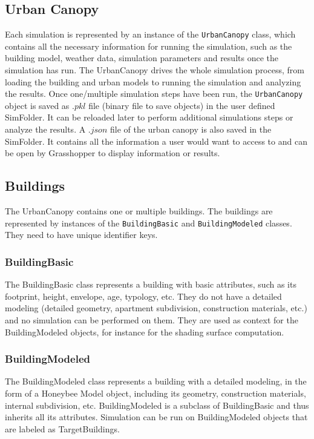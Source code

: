 \documentclass[a4paper,12pt]{article} %
\begin{document}
    \subsection{Urban Canopy}
    \label{subsec:urban-canopy}
    Each simulation is represented by an instance of the \texttt{UrbanCanopy} class, which contains all the necessary information for running the simulation, such as the building model, weather data, simulation parameters and results once the simulation has run.
    The \gls{UrbanCanopy} drives the whole simulation process, from loading the building and urban models to running the simulation and analyzing the results.
    Once one/multiple simulation steps have been run, the \texttt{UrbanCanopy} object is saved as $.pkl$ file (binary file to save objects) in the user defined \gls{SimFolder}.
    It can be reloaded later to perform additional simulations steps or analyze the results.
    A $.json$ file of the urban canopy is also saved in the \gls{SimFolder}.
    It contains all the information a user would want to access to and can be open by Grasshopper to display information or results.

    \subsection{Buildings}
    \label{subsec:buildings}
    The \gls{UrbanCanopy} contains one or multiple buildings.
    The buildings are represented by instances of the \texttt{BuildingBasic} and \texttt{BuildingModeled} classes.
    They need to have unique identifier keys.

    \subsubsection{BuildingBasic}
    \label{subsubsec:building-basic}
    The \gls{BuildingBasic} class represents a building with basic attributes, such as its footprint, height, envelope, age, typology, etc.
    They do not have a detailed modeling (detailed geometry, apartment subdivision, construction materials, etc.) and no simulation can be performed on them.
    They are used as context for the \gls{BuildingModeled} objects, for instance for the shading surface computation.

    \subsubsection{BuildingModeled}
    \label{subsubsec:building-modeled}
    The \gls{BuildingModeled} class represents a building with a detailed modeling, in the form of a Honeybee Model object, including its geometry, construction materials, internal subdivision, etc.
    \gls{BuildingModeled} is a subclass of \gls{BuildingBasic} and thus inherits all its attributes.
    Simulation can be run on \gls{BuildingModeled} objects that are labeled as \glspl{TargetBuilding}.
\end{document}
